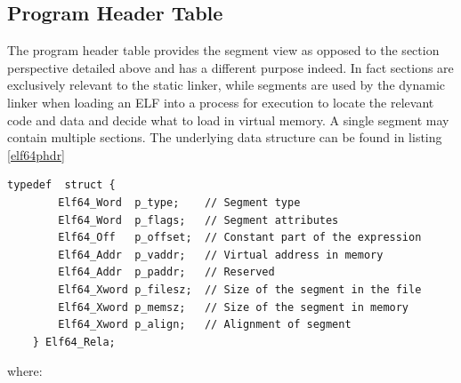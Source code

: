 \documentclass[paper=a4, fontsize=11pt]{report} %
\numberwithin{equation}{section} %
\numberwithin{figure}{section} %
\numberwithin{table}{section} %
\begin{document}
\subsection{Program Header Table}
The program header table provides the segment view as opposed to the section 
perspective detailed above and has a different purpose indeed. In fact sections 
are exclusively relevant to the static linker, while segments are used by the 
dynamic linker when loading an ELF into a process for execution to locate the 
relevant code and data and decide what to load in virtual memory. A single 
segment may contain multiple sections. The underlying data structure can be 
found in listing \ref{elf64phdr}
\begin{lstlisting}[style=ansic, caption={Program Header}, label=elf64phdr]
	typedef  struct {
		Elf64_Word 	p_type;    // Segment type
		Elf64_Word 	p_flags;   // Segment attributes
		Elf64_Off 	p_offset;  // Constant part of the expression
		Elf64_Addr 	p_vaddr;   // Virtual address in memory
		Elf64_Addr 	p_paddr;   // Reserved
		Elf64_Xword p_filesz;  // Size of the segment in the file
		Elf64_Xword p_memsz;   // Size of the segment in memory
		Elf64_Xword p_align;   // Alignment of segment
	} Elf64_Rela;
\end{lstlisting}
where:
\end{document}
